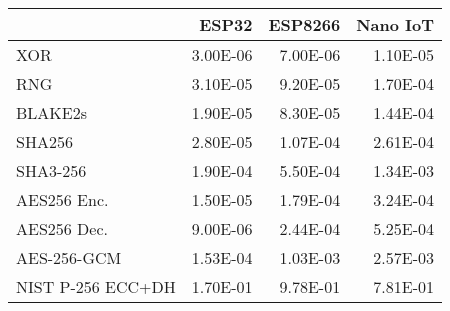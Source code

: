 \begin{tabular}{lrrr}
\toprule
{} &    ESP32 &  ESP8266 &  Nano IoT \\
\midrule
XOR               & 3.00E-06 & 7.00E-06 &  1.10E-05 \\
RNG               & 3.10E-05 & 9.20E-05 &  1.70E-04 \\
BLAKE2s           & 1.90E-05 & 8.30E-05 &  1.44E-04 \\
SHA256            & 2.80E-05 & 1.07E-04 &  2.61E-04 \\
SHA3-256          & 1.90E-04 & 5.50E-04 &  1.34E-03 \\
AES256 Enc.       & 1.50E-05 & 1.79E-04 &  3.24E-04 \\
AES256 Dec.       & 9.00E-06 & 2.44E-04 &  5.25E-04 \\
AES-256-GCM       & 1.53E-04 & 1.03E-03 &  2.57E-03 \\
NIST P-256 ECC+DH & 1.70E-01 & 9.78E-01 &  7.81E-01 \\
\bottomrule
\end{tabular}
